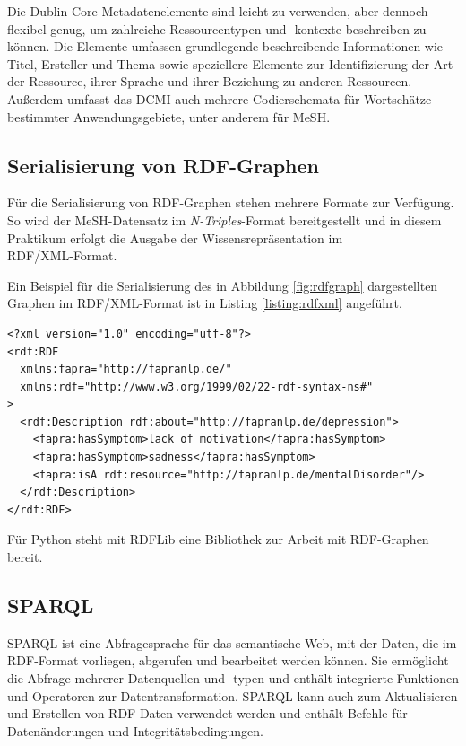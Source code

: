 Die Dublin-Core-Metadatenelemente sind leicht zu verwenden, aber dennoch flexibel genug, um zahlreiche Ressourcentypen und -kontexte beschreiben zu können. Die Elemente umfassen grundlegende beschreibende Informationen wie Titel, Ersteller und Thema sowie speziellere Elemente zur Identifizierung der Art der Ressource, ihrer Sprache und ihrer Beziehung zu anderen Ressourcen. Außerdem umfasst das \ac{DCMI} auch mehrere Codierschemata für Wortschätze bestimmter Anwendungsgebiete, unter anderem für \ac{MeSH}.



\subsection{Serialisierung von RDF-Graphen}

Für die Serialisierung von RDF-Graphen stehen mehrere Formate zur Verfügung. So wird der MeSH-Datensatz im \emph{N-Triples}-Format bereitgestellt und in diesem Praktikum erfolgt die Ausgabe der Wissensrepräsentation im \\
RDF/XML-Format.

Ein Beispiel für die Serialisierung des in Abbildung \ref{fig:rdfgraph} dargestellten Graphen im RDF/XML-Format ist in Listing \ref{listing:rdfxml} angeführt.

\lstset{language=XML, caption=RDF/XML, label=listing:rdfxml}
\begin{lstlisting}
<?xml version="1.0" encoding="utf-8"?>
<rdf:RDF
  xmlns:fapra="http://fapranlp.de/"
  xmlns:rdf="http://www.w3.org/1999/02/22-rdf-syntax-ns#"
>
  <rdf:Description rdf:about="http://fapranlp.de/depression">
    <fapra:hasSymptom>lack of motivation</fapra:hasSymptom>
    <fapra:hasSymptom>sadness</fapra:hasSymptom>
    <fapra:isA rdf:resource="http://fapranlp.de/mentalDisorder"/>
  </rdf:Description>
</rdf:RDF>
\end{lstlisting}




Für Python steht mit RDFLib \cite{rdflib_team_rdflib_2022} eine Bibliothek zur Arbeit mit RDF-Graphen bereit.

\subsection{SPARQL}
\ac{SPARQL} ist eine Abfragesprache für das semantische Web, mit der Daten, die im RDF-Format vorliegen, abgerufen und bearbeitet werden können. Sie ermöglicht die Abfrage mehrerer Datenquellen und -typen und enthält integrierte Funktionen und Operatoren zur Datentransformation. SPARQL kann auch zum Aktualisieren und Erstellen von RDF-Daten verwendet werden und enthält Befehle für Datenänderungen und Integritätsbedingungen. 